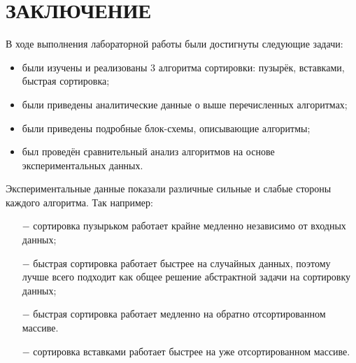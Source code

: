 \chapter{ЗАКЛЮЧЕНИЕ}

В ходе выполнения лабораторной работы были достигнуты следующие задачи:

\begin{itemize}
    \item были изучены и реализованы 3 алгоритма сортировки: пузырёк, вставками, быстрая сортировка;
    \item были приведены аналитические данные о выше перечисленных алгоритмах;
    \item были приведены подробные блок-схемы, описывающие алгоритмы;
    \item был проведён сравнительный анализ алгоритмов на основе экспериментальных данных.
\end{itemize}

Экспериментальные данные показали различные сильные и слабые стороны каждого алгоритма.
Так например:
\begin{itemize}
    \item[$-$] сортировка пузырьком работает крайне медленно независимо от входных данных;
    \item[$-$] быстрая сортировка работает быстрее на случайных данных, поэтому лучше всего подходит как общее решение абстрактной задачи на сортировку данных;
    \item[$-$] быстрая сортировка работает медленно на обратно отсортированном массиве.
    \item[$-$] сортировка вставками работает быстрее на уже отсортированном массиве.
\end{itemize}
